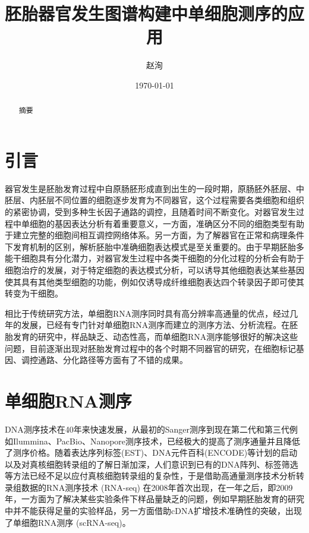 \documentclass[lang=cn]{elegantpaper}
\title{胚胎器官发生图谱构建中单细胞测序的应用}
\author{赵洵}
\institute{中国科学院大学}
\date{\today}
\begin{document}
\maketitle

\begin{abstract}
摘要
\end{abstract}

\section{引言}
器官发生是胚胎发育过程中自原肠胚形成直到出生的一段时期\citep{gilbert_developmental_2017}，原肠胚外胚层、中胚层、内胚层不同位置的细胞逐步发育为不同器官，这个过程需要各类细胞和组织的紧密协调，受到多种生长因子通路的调控，且随着时间不断变化\citep{zorn_vertebrate_2009}。对器官发生过程中单细胞的基因表达分析有着重要意义，一方面，准确区分不同的细胞类型有助于建立完整的细胞间相互调控网络体系\citep{dong_single-cell_2018}。另一方面，为了解器官在正常和病理条件下发育机制的区别，解析胚胎中准确细胞表达模式是至关重要的\citep{belle_tridimensional_2017}。由于早期胚胎多能干细胞具有分化潜力，对器官发生过程中各类干细胞的分化过程的分析会有助于细胞治疗的发展\citep{lancaster_organogenesis_2014}，对于特定细胞的表达模式分析，可以诱导其他细胞表达某些基因使其具有其他类型细胞的功能，例如仅诱导成纤维细胞表达四个转录因子即可使其转变为干细胞\citep{takahashi_induction_2006}。

相比于传统研究方法，单细胞RNA测序同时具有高分辨率高通量的优点，经过几年的发展，已经有专门针对单细胞RNA测序而建立的测序方法、分析流程。在胚胎发育的研究中，样品缺乏、动态性高，而单细胞RNA测序能够很好的解决这些问题，目前逐渐出现对胚胎发育过程中的各个时期不同器官的研究，在细胞标记基因、调控通路、分化路径等方面有了不错的成果。

\section{单细胞RNA测序}
DNA测序技术在40年来快速发展，从最初的Sanger测序到现在第二代和第三代例如Ilummina、PacBio、Nanopore测序技术，已经极大的提高了测序通量并且降低了测序价格\citep{shendure_dna_2017}。随着表达序列标签(EST)、DNA元件百科(ENCODE)等计划的启动以及对真核细胞转录组的了解日渐加深\citep{birney_identification_2007}，人们意识到已有的DNA阵列、标签筛选等方法已经不足以应付真核细胞转录组的复杂性，于是借助高通量测序技术分析转录组数据的RNA测序技术 (RNA-seq) 在2008年首次出现\citep{cloonan_stem_2008}，在一年之后，即2009年，一方面为了解决某些实验条件下样品量缺乏的问题，例如早期胚胎发育的研究中并不能获得足量的实验样品，另一方面借助cDNA扩增技术准确性的突破，出现了单细胞RNA测序 (scRNA-seq)\citep{tang_mrna-seq_2009}。
\end{document}
